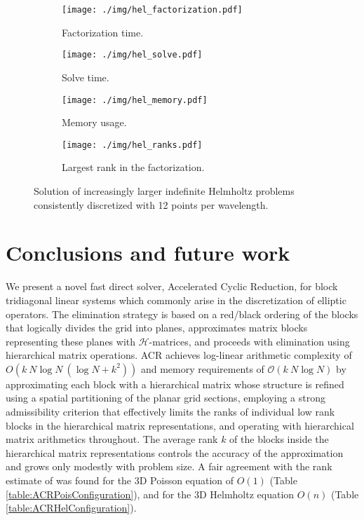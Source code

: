 \documentclass[]{elsarticle}
\begin{document}
\begin{figure}[]
	\centering
	\begin{subfigure}{0.4\textwidth}
		\centering
		\texttt{[image: ./img/hel\_factorization.pdf]}
		\caption{Factorization time.}
		\label{fig:hel1}
	\end{subfigure}
	\begin{subfigure}{0.4\textwidth}
		\centering
		\texttt{[image: ./img/hel\_solve.pdf]}
		\caption{Solve time.}
		\label{fig:hel2}
	\end{subfigure}
	\begin{subfigure}{0.4\textwidth}
		\centering
		\texttt{[image: ./img/hel\_memory.pdf]}
		\caption{Memory usage.}
		\label{fig:hel3}
	\end{subfigure}
	\begin{subfigure}{0.4\textwidth}
		\centering
		\texttt{[image: ./img/hel\_ranks.pdf]}
		\caption{Largest rank in the factorization.}
		\label{fig:hel4}
	\end{subfigure}
\caption{Solution of increasingly larger indefinite Helmholtz problems consistently discretized with 12 points per wavelength.}
\label{fig:helm}
\end{figure}

\clearpage
\section{Conclusions and future work}

We present a novel fast direct solver, Accelerated Cyclic Reduction, for block tridiagonal linear systems which commonly arise in the discretization of elliptic operators. The elimination strategy is based on a red/black ordering of the blocks that logically divides the grid into planes, approximates matrix blocks representing these planes with $\mathcal{H}$-matrices, and proceeds with elimination using hierarchical matrix operations. ACR achieves log-linear arithmetic complexity of $O(k~N \log N~(\log N + k^2))$ and memory requirements of $\mathcal{O}(k~N \log N)$ by approximating each block with a hierarchical matrix whose structure is refined using a spatial partitioning of the planar grid sections, employing a strong admissibility criterion that effectively limits the ranks of individual low rank blocks in the hierarchical matrix representations, and operating with hierarchical matrix arithmetics throughout. The average rank $k$ of the blocks inside the hierarchical matrix representations controls the accuracy of the approximation and grows only modestly with problem size. A fair agreement with the rank estimate of \cite{chandrasekaran2010} was found for the 3D Poisson equation of $O(1)$ (Table \ref{table:ACRPoisConfiguration}), and for the 3D Helmholtz equation $O(n)$ (Table \ref{table:ACRHelConfiguration}).
\end{document}
